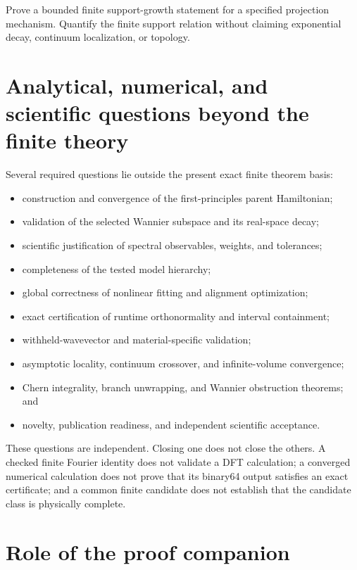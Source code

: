\begin{openproblem}
Prove a bounded finite support-growth statement for a specified projection mechanism.
Quantify the finite support relation without claiming exponential decay, continuum
localization, or topology.
\end{openproblem}

\section{Analytical, numerical, and scientific questions beyond the finite theory}

Several required questions lie outside the present exact finite theorem basis:

\begin{itemize}
  \item construction and convergence of the first-principles parent Hamiltonian;
  \item validation of the selected Wannier subspace and its real-space decay;
  \item scientific justification of spectral observables, weights, and tolerances;
  \item completeness of the tested model hierarchy;
  \item global correctness of nonlinear fitting and alignment optimization;
  \item exact certification of runtime orthonormality and interval containment;
  \item withheld-wavevector and material-specific validation;
  \item asymptotic locality, continuum crossover, and infinite-volume convergence;
  \item Chern integrality, branch unwrapping, and Wannier obstruction theorems; and
  \item novelty, publication readiness, and independent scientific acceptance.
\end{itemize}

These questions are independent.  Closing one does not close the others.  A checked
finite Fourier identity does not validate a DFT calculation; a converged numerical
calculation does not prove that its binary64 output satisfies an exact certificate; and
a common finite candidate does not establish that the candidate class is physically
complete.

\section{Role of the proof companion}

